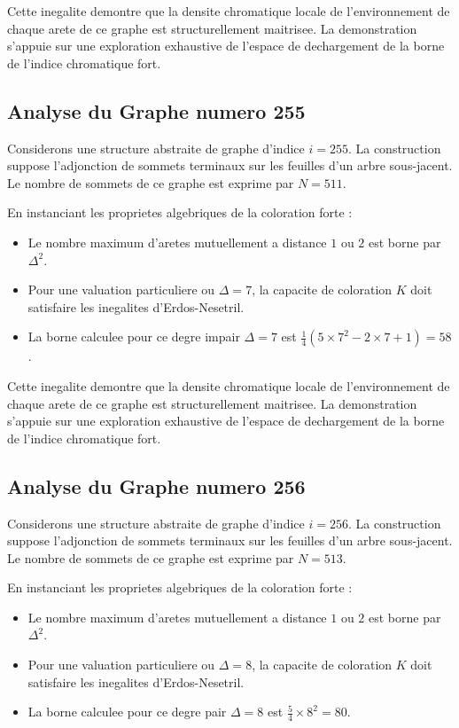 \documentclass[11pt,a4paper]{article}
\begin{document}
Cette inegalite demontre que la densite chromatique locale de l'environnement de chaque arete de ce graphe est structurellement maitrisee. La demonstration s'appuie sur une exploration exhaustive de l'espace de dechargement de la borne de l'indice chromatique fort.

\subsection{Analyse du Graphe numero 255}
Considerons une structure abstraite de graphe d'indice $i = 255$. La construction suppose l'adjonction de sommets terminaux sur les feuilles d'un arbre sous-jacent. Le nombre de sommets de ce graphe est exprime par $N = 511$.

En instanciant les proprietes algebriques de la coloration forte :
\begin{itemize}
\item Le nombre maximum d'aretes mutuellement a distance $1$ ou $2$ est borne par $\Delta^2$.
\item Pour une valuation particuliere ou $\Delta = 7$, la capacite de coloration $K$ doit satisfaire les inegalites d'Erdos-Nesetril.
\item La borne calculee pour ce degre impair $\Delta = 7$ est $\frac{1}{4}(5 \times 7^2 - 2 \times 7 + 1) = 58$.
\end{itemize}

Cette inegalite demontre que la densite chromatique locale de l'environnement de chaque arete de ce graphe est structurellement maitrisee. La demonstration s'appuie sur une exploration exhaustive de l'espace de dechargement de la borne de l'indice chromatique fort.

\subsection{Analyse du Graphe numero 256}
Considerons une structure abstraite de graphe d'indice $i = 256$. La construction suppose l'adjonction de sommets terminaux sur les feuilles d'un arbre sous-jacent. Le nombre de sommets de ce graphe est exprime par $N = 513$.

En instanciant les proprietes algebriques de la coloration forte :
\begin{itemize}
\item Le nombre maximum d'aretes mutuellement a distance $1$ ou $2$ est borne par $\Delta^2$.
\item Pour une valuation particuliere ou $\Delta = 8$, la capacite de coloration $K$ doit satisfaire les inegalites d'Erdos-Nesetril.
\item La borne calculee pour ce degre pair $\Delta = 8$ est $\frac{5}{4} \times 8^2 = 80$.
\end{itemize}
\end{document}
